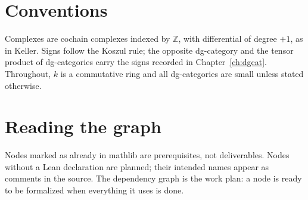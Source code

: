 \section*{Conventions}

Complexes are cochain complexes indexed by $\mathbb{Z}$, with differential of degree $+1$,
as in Keller. Signs follow the Koszul rule; the opposite dg-category and the tensor product
of dg-categories carry the signs recorded in Chapter~\ref{ch:dgcat}.
Throughout, $k$ is a commutative ring and all dg-categories are small unless stated otherwise.

\section*{Reading the graph}

Nodes marked as already in mathlib are prerequisites, not deliverables. Nodes without a
Lean declaration are planned; their intended names appear as comments in the source.
The dependency graph is the work plan: a node is ready to be formalized when everything it
uses is done.
